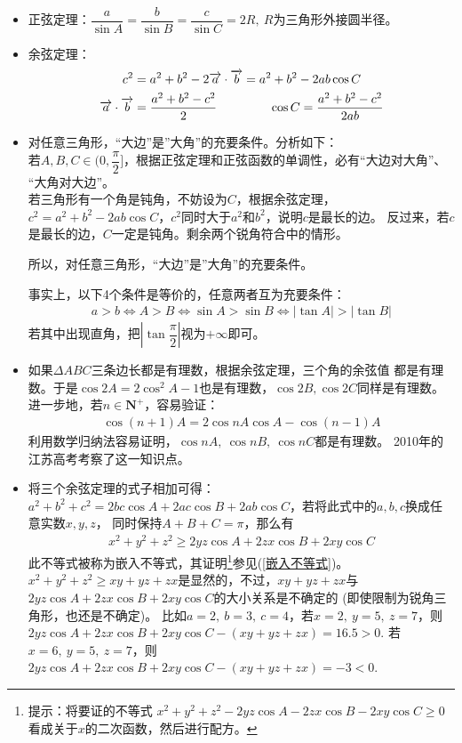\begin{itemize}[leftmargin=\inteval{\myitemleftmargin}pt,itemsep=
   \inteval{\myitemitempsep}pt,topsep=\inteval{\myitemtopsep}pt]
\item 正弦定理：$ \dfrac{a}{\sin A}=\dfrac{b}{\sin B}=
\dfrac{c}{\sin C} =2R,\ R $为三角形外接圆半径。

\item 余弦定理：
\begin{gather*}
    c^2=a^2+b^2-2\vec{a}\cdot\vec{b}
    =a^2+b^2-2ab\cos C  \\
    \vec{a}\cdot\vec{b}=\dfrac{a^2+b^2-c^2}{2} 
    \hspace{1.5cm}     \cos C=\dfrac{a^2+b^2-c^2}{2ab}  
\end{gather*}

\item 对任意三角形，“大边”是”大角”的充要条件。分析如下：\\
若$ A,B,C\in(0,\dfrac{\pi}{2}] $，根据正弦定理和正弦函数的单调性，必有“大边对大角”、
“大角对大边”。\\
若三角形有一个角是钝角，不妨设为$ C $，根据余弦定理，
$ c^2=a^2+b^2-2ab\cos C $，$ c^2 $同时大于$ a^2 $和$ b^2 $，说明$ c $是最长的边。
反过来，若$ c $是最长的边，$ C $一定是钝角。剩余两个锐角符合中的情形。

所以，对任意三角形，“大边”是”大角”的充要条件。

事实上，以下4个条件是等价的，任意两者互为充要条件：
\begin{align*}
    a>b \Leftrightarrow A>B \Leftrightarrow \sin A>\sin B \Leftrightarrow 
    |\tan A|>|\tan B| 
\end{align*}
若其中出现直角，把$ \left|\tan \dfrac{\pi}{2}\right| $视为$ +\infty $即可。

\item 如果$ \Delta ABC $三条边长都是有理数，根据余弦定理，三个角的余弦值
都是有理数。于是$ \cos2A=2\cos^2A-1 $也是有理数，$ \cos2B,\cos2C $同样是有理数。
进一步地，若$ n\in \textbf{N}^+ $，容易验证：
\begin{align*}
    \cos(n+1)A =2\cos nA\cos A -\cos(n-1)A
\end{align*}
利用数学归纳法容易证明，$ \cos nA,\ \cos nB,\ \cos nC $都是有理数。
2010年的江苏高考考察了这一知识点。

\item 将三个余弦定理的式子相加可得：$ a^2+b^2+c^2=2bc\cos A+2ac\cos B+
2ab\cos C $，若将此式中的$ a,b,c $换成任意实数$ x,y,z $，
同时保持$ A+B+C=\pi $，那么有
\begin{gather*}
    x^2+y^2+z^2\geq 2yz\cos A+2zx\cos B + 2xy\cos C
\end{gather*}
此不等式被称为嵌入不等式，其证明\footnote{提示：将要证的不等式
    $ x^2+y^2+z^2-2yz\cos A-2zx\cos B -2xy\cos C \geq 0 $
    看成关于$ x $的二次函数，然后进行配方。}参见(\ref{嵌入不等式})。
$ x^2+y^2+z^2\geq xy+yz+zx $是显然的，不过，$ xy+yz+zx $与
$ 2yz\cos A+2zx\cos B + 2xy\cos C $的大小关系是不确定的
(即使限制为锐角三角形，也还是不确定)。
比如$ a=2,\ b=3,\ c=4 $，若$ x=2,\ y=5,\ z=7 $，则
$ 2yz\cos A+2zx\cos B + 2xy\cos C-(xy+yz+zx)=16.5>0 $. 
若$ x=6,\ y=5,\ z=7 $，则
$ 2yz\cos A+2zx\cos B + 2xy\cos C-(xy+yz+zx)=-3<0 $. 


\end{itemize}
